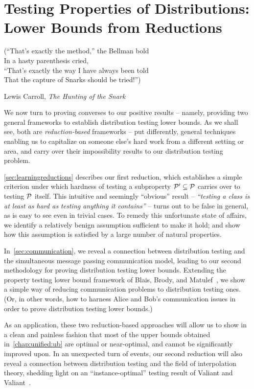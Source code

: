 \chapter{Testing Properties of Distributions: Lower Bounds from Reductions}\label{chap:unified:lb}

\epigraph{(``That's exactly the method,'' the Bellman bold\\
In a hasty parenthesis cried,\\
``That's exactly the way I have always been told\\
That the capture of Snarks should be tried!'')}{Lewis Carroll, \textit{The Hunting of the Snark}}

We now turn to proving converses to our positive results -- namely, providing two general frameworks to establish distribution testing lower bounds. As we shall see, both are \emph{reduction-based} frameworks -- put differently, general techniques enabling us to capitalize on someone else's hard work from a different setting or area, and carry over their impossibility results to our distribution testing problem.

\cref{sec:learningreductions} describes our first reduction, which establishes a simple criterion under which hardness of testing a subproperty $\mathcal{P}'\subseteq \mathcal{P}$ carries over to testing $\mathcal{P}$ itself. This intuitive and seemingly ``obvious'' result -- \emph{``testing a class is at least as hard as testing anything it contains''} -- turns out to be false in general, as is easy to see even in trivial cases. To remedy this unfortunate state of affairs, we identify a relatively benign assumption sufficient to make it hold; and show how this assumption is satisfied by a large number of natural properties.

In~\cref{sec:communication}, we reveal a connection between distribution testing and the simultaneous message passing communication model, leading to our second methodology for proving distribution testing lower bounds. Extending the property testing lower bound framework of Blais, Brody, and Matulef~\cite{BBM:12}, we show a simple way of reducing communication problems to distribution testing ones. (Or, in other words, how to harness Alice and Bob's communication issues in order to prove distribution testing lower bounds.)

As an application, these two reduction-based approaches will allow us to show in a clean and painless fashion that most of the upper bounds obtained in~\cref{chap:unified:ub} are optimal or near-optimal, and cannot be significantly improved upon. In an unexpected turn of events, our second reduction will also reveal a connection between distribution testing and the field of interpolation theory, shedding light on an ``instance-optimal'' testing result of Valiant and Valiant~\cite{VV:14}.

